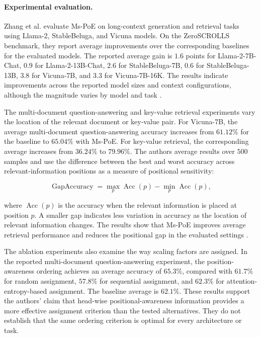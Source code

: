 \paragraph{Experimental evaluation.}
Zhang et al. evaluate Ms-PoE on long-context generation and retrieval
tasks using Llama-2, StableBeluga, and Vicuna models. On the
ZeroSCROLLS benchmark, they report average improvements over the
corresponding baselines for the evaluated models. The reported average
gain is \(1.6\) points for Llama-2-7B-Chat, \(0.9\) for
Llama-2-13B-Chat, \(2.6\) for StableBeluga-7B, \(0.6\) for
StableBeluga-13B, \(3.8\) for Vicuna-7B, and \(3.3\) for
Vicuna-7B-16K. The results indicate improvements across the reported
model sizes and context configurations, although the magnitude varies
by model and task \parencite{zhang2024foundmiddle}.

The multi-document question-answering and key-value retrieval
experiments vary the location of the relevant document or key-value
pair. For Vicuna-7B, the average multi-document question-answering
accuracy increases from \(61.12\%\) for the baseline to \(65.04\%\)
with Ms-PoE. For key-value retrieval, the corresponding average
increases from \(36.24\%\) to \(79.96\%\). The authors average results
over \(500\) samples and use the difference between the best and worst
accuracy across relevant-information positions as a measure of
positional sensitivity:

\begin{equation}
    \operatorname{GapAccuracy}
    =
    \max_{p}\operatorname{Acc}(p)
    -
    \min_{p}\operatorname{Acc}(p),
    \label{eq:pe-gap-accuracy}
\end{equation}

where \(\operatorname{Acc}(p)\) is the accuracy when the relevant
information is placed at position \(p\). A smaller gap indicates less
variation in accuracy as the location of relevant information changes.
The results show that Ms-PoE improves average retrieval performance
and reduces the positional gap in the evaluated settings
\parencite{zhang2024foundmiddle}.

The ablation experiments also examine the way scaling factors are
assigned. In the reported multi-document question-answering experiment,
the position-awareness ordering achieves an average accuracy of
\(65.3\%\), compared with \(61.7\%\) for random assignment,
\(57.8\%\) for sequential assignment, and \(62.3\%\) for
attention-entropy-based assignment. The baseline average is
\(62.1\%\). These results support the authors' claim that head-wise
positional-awareness information provides a more effective assignment
criterion than the tested alternatives. They do not establish that the
same ordering criterion is optimal for every architecture or task.

